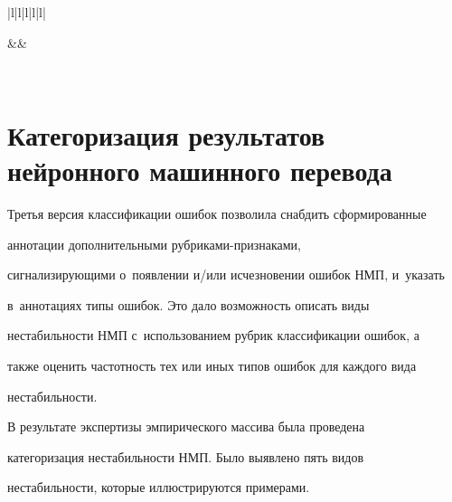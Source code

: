 \begin{table}
\begin{center}
\begin{tabular}{|l|l|l|l|l|}


&&


\\


\hline




\end{tabular}


\end{center}


\end{table}





\section{Категоризация результатов нейронного машинного перевода}





  Третья версия классификации ошибок позволила снабдить сформированные 


аннотации дополнительными руб\-ри\-ка\-ми-приз\-на\-ка\-ми, 


сигнализирующими о~появлении и\!/\!или исчезновении ошибок НМП, и~указать 


в~аннотациях типы ошибок. Это дало возможность описать виды 


нестабильности НМП с~использованием рубрик классификации ошибок, а 


также оценить частотность тех или иных типов ошибок для каждого вида 


нестабильности. 


  


  В результате экспертизы эмпирического массива была проведена 


категоризация нестабильности НМП. Было выявлено пять видов 


нестабильности, которые иллюстрируются примерами.


